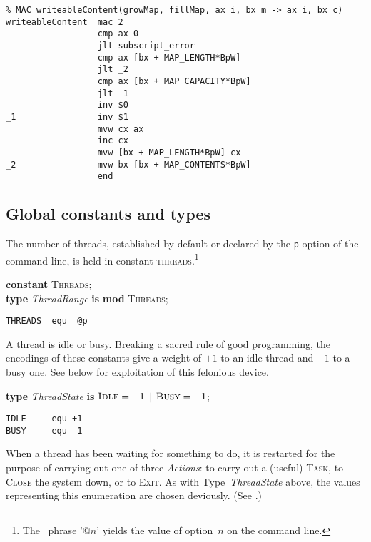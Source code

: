 {\small
\begin{verbatim}
% MAC writeableContent(growMap, fillMap, ax i, bx m -> ax i, bx c)
writeableContent  mac 2
                  cmp ax 0
                  jlt subscript_error
                  cmp ax [bx + MAP_LENGTH*BpW]
                  jlt _2
                  cmp ax [bx + MAP_CAPACITY*BpW]
                  jlt _1
                  inv $0
_1                inv $1
                  mvw cx ax
                  inc cx
                  mvw [bx + MAP_LENGTH*BpW] cx
_2                mvw bx [bx + MAP_CONTENTS*BpW]
                  end
\end{verbatim}}



\subsection{Global constants and types}\label{scalars}

The number of threads, established by default or declared by the \texttt{p}-option of the command line, is held in constant \textsc{threads}.\footnote{The \dvmasm\ phrase '@$n$' yields the value of option~$n$ on the command line.}

\begin{tabbing}
\indents
\vb\>\textbf{constant} \textsc{Threads}; \\
\vb\>\textbf{type} \emph{ThreadRange} \textbf{is} \textbf{mod} \textsc{Threads};
\end{tabbing}

{\small
\begin{verbatim}
THREADS  equ  @p
\end{verbatim}}

A thread is idle or busy. Breaking a sacred rule of good programming, the encodings of these constants give a weight of $+1$ to an idle thread and $-1$ to a busy one. See  below for exploitation of this felonious device.

\begin{tabbing}
\indents
\vb\>\textbf{type} \emph{ThreadState} \textbf{is}
   $\textsc{Idle} = +1$ $|$  $\textsc{Busy} = -1$;
\end{tabbing}

{\small
\begin{verbatim}
IDLE     equ +1
BUSY     equ -1
\end{verbatim}}

When a thread has been waiting for something to do, it is restarted for the purpose of carrying out one of three \emph{Actions}: to carry out a (useful) \textsc{Task}, to \textsc{Close} the system down, or to \textsc{Exit}. As with Type~\emph{ThreadState} above, the values representing this enumeration are chosen deviously. (See .)

